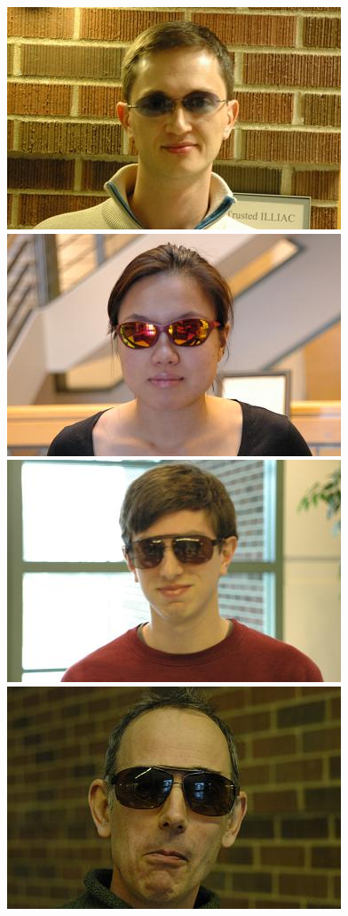 \documentclass[10pt,journal,letterpaper,compsoc]{IEEEtran} %
\begin{document}
\begin{figure}[t]
\centering
\includegraphics[scale=0.75,clip=true]{figures_pami/uiuc_example/sunglasses/DSC_1565.JPG}
\includegraphics[scale=0.75,clip=true]{figures_pami/uiuc_example/sunglasses/DSC_3656.JPG}
\includegraphics[scale=0.75,clip=true]{figures_pami/uiuc_example/sunglasses/DSC_3827.JPG}
\includegraphics[scale=0.75,clip=true]{figures_pami/uiuc_example/sunglasses/DSC_4090.JPG}

\end{figure}
\end{document}
